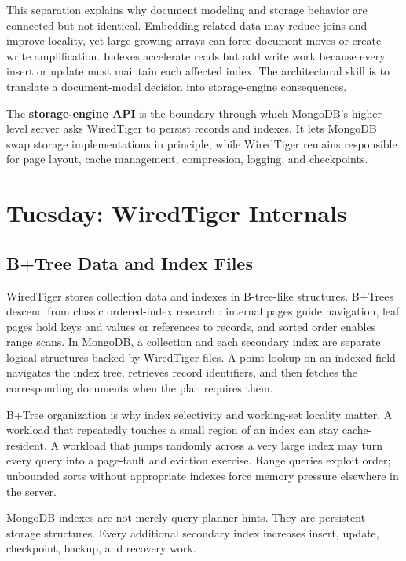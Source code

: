 This separation explains why document modeling and storage behavior are connected but not identical. Embedding related data may reduce joins and improve locality, yet large growing arrays can force document moves or create write amplification. Indexes accelerate reads but add write work because every insert or update must maintain each affected index. The architectural skill is to translate a document-model decision into storage-engine consequences.

\begin{definitionbox}
The \textbf{storage-engine API} is the boundary through which MongoDB's higher-level server asks WiredTiger to persist records and indexes. It lets MongoDB swap storage implementations in principle, while WiredTiger remains responsible for page layout, cache management, compression, logging, and checkpoints.
\end{definitionbox}

\section{Tuesday: WiredTiger Internals}
\subsection{B+Tree Data and Index Files}
WiredTiger stores collection data and indexes in B-tree-like structures. B+Trees descend from classic ordered-index research \cite{bayer1972organization}: internal pages guide navigation, leaf pages hold keys and values or references to records, and sorted order enables range scans. In MongoDB, a collection and each secondary index are separate logical structures backed by WiredTiger files. A point lookup on an indexed field navigates the index tree, retrieves record identifiers, and then fetches the corresponding documents when the plan requires them.

B+Tree organization is why index selectivity and working-set locality matter. A workload that repeatedly touches a small region of an index can stay cache-resident. A workload that jumps randomly across a very large index may turn every query into a page-fault and eviction exercise. Range queries exploit order; unbounded sorts without appropriate indexes force memory pressure elsewhere in the server.

\begin{notebox}
MongoDB indexes are not merely query-planner hints. They are persistent storage structures. Every additional secondary index increases insert, update, checkpoint, backup, and recovery work.
\end{notebox}

